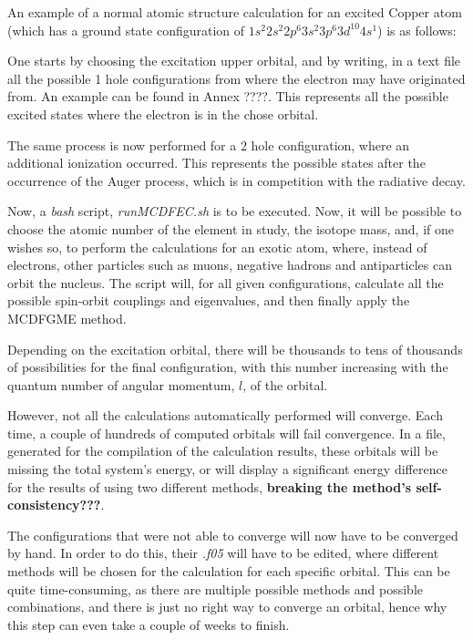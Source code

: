  An example of a normal atomic structure calculation for an excited Copper atom (which has a ground state configuration of $1s^2 2s^2 2p^6 3s^2 3p^6 3d^{10} 4s^1$) is as follows:

 One starts by choosing the excitation upper orbital, and by  writing, in a text file all the possible 1 hole configurations from where the electron may have originated from. An example can be found in Annex ????. This represents all the possible excited states where the electron is in the chose orbital.
 
 The same process is now performed for a 2 hole configuration, where an additional ionization occurred. This represents the possible states after the occurrence of the Auger process, which is in competition with the radiative decay.

 Now, a \textit{bash} script, \textit{runMCDFEC.sh} is to be executed. Now, it will be possible to choose the atomic number of the element in study, the isotope mass, and, if one wishes so, to perform the calculations for an exotic atom, where, instead of electrons, other particles such as muons, negative hadrons and antiparticles can orbit the nucleus. 
 The script will, for all given configurations, calculate all the possible spin-orbit couplings and eigenvalues, and then finally apply the \gls{MCDFGME} method.

 Depending on the excitation orbital, there will be thousands to tens of thousands of possibilities for the final configuration, with this number increasing with the quantum number of angular momentum, $l$, of the orbital.
 
 However, not all the calculations automatically performed will converge. Each time, a couple of hundreds of computed orbitals will fail convergence. In a file, generated for the compilation of the calculation results, these orbitals will be missing the total system's energy, or will display a significant energy difference for the results of using two different methods, \textbf{breaking the method's self-consistency???}.

 The configurations that were not able to converge will now have to be converged by hand. In order to do this, their \textit{.f05} will have to be edited, where different methods will be chosen for the calculation for each specific orbital. This can be quite time-consuming, as there are multiple possible methods and possible combinations, and there is just no right way to converge an orbital, hence why this step can even take a couple of weeks to finish.

